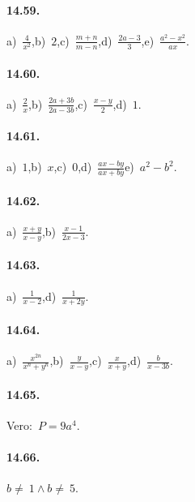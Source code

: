 \paragraph{14.59.}
a)~$\frac{4}{x^{2}}$,\quad b)~$2$,\quad c)~$\frac{m+n}{m-n}$,\quad d)~$\frac{2a-3}{3}$,\quad e)~$\frac{a^{2}-x^{2}}{ax}$.

\paragraph{14.60.}
a)~$\frac{2}{x}$,\quad b)~$\frac{2a+3b}{2a-3b}$,\quad c)~$\frac{x-y}{2}$,\quad d)~$1$.

\paragraph{14.61.}
a)~$1$,\quad b)~$x$,\quad c)~$0$,\quad d)~$\frac{ax-by}{ax+by}$\quad e)~$a^{2}-b^{2}$.

\paragraph{14.62.}
a)~$\frac{x+y}{x-y}$,\quad b)~$\frac{x-1}{2x-3}$.

\paragraph{14.63.}
a)~$\frac{1}{x-2}$,\quad d)~$\frac{1}{x+2y}$.

\paragraph{14.64.}
a)~$\frac{x^{2n}}{x^{n}+y^{n}}$,\quad b)~$\frac{y}{x-y}$,\quad c)~$\frac{x}{x+y}$,\quad d)~$\frac{b}{x-3b}$.

\paragraph{14.65.}Vero:~$P=9a^{4}$.

\paragraph{14.66.}$b\neq~1\wedge b\neq~5$.

